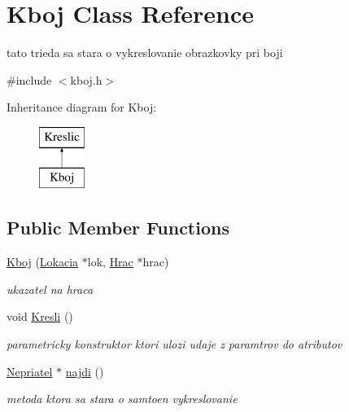 \hypertarget{class_kboj}{\section{Kboj Class Reference}
\label{class_kboj}
}


tato trieda sa stara o vykreslovanie obrazkovky pri boji  




{\ttfamily \#include $<$kboj.\-h$>$}

Inheritance diagram for Kboj\-:\begin{figure}[H]
\begin{center}
\leavevmode
\includegraphics[height=2.000000cm]{class_kboj}
\end{center}
\end{figure}
\subsection*{Public Member Functions}
\begin{DoxyCompactItemize}
\item 
\hypertarget{class_kboj_a7d88c71591763faf1cc9c33dc4aa84b5}{\hyperlink{class_kboj_a7d88c71591763faf1cc9c33dc4aa84b5}{Kboj} (\hyperlink{class_lokacia}{Lokacia} $\ast$lok, \hyperlink{class_hrac}{Hrac} $\ast$hrac)}\label{class_kboj_a7d88c71591763faf1cc9c33dc4aa84b5}

\begin{DoxyCompactList}\small\item\em ukazatel na hraca \end{DoxyCompactList}\item 
\hypertarget{class_kboj_af62fd0316418ce641fe7e388df88fdfd}{void \hyperlink{class_kboj_af62fd0316418ce641fe7e388df88fdfd}{Kresli} ()}\label{class_kboj_af62fd0316418ce641fe7e388df88fdfd}

\begin{DoxyCompactList}\small\item\em parametricky konstruktor ktori ulozi udaje z paramtrov do atributov \end{DoxyCompactList}\item 
\hypertarget{class_kboj_aca5a9f94fa87d6ccf1cd3f0ad0e0cfdb}{\hyperlink{class_nepriatel}{Nepriatel} $\ast$ \hyperlink{class_kboj_aca5a9f94fa87d6ccf1cd3f0ad0e0cfdb}{najdi} ()}\label{class_kboj_aca5a9f94fa87d6ccf1cd3f0ad0e0cfdb}

\begin{DoxyCompactList}\small\item\em metoda ktora sa stara o samtoen vykreslovanie \end{DoxyCompactList}\end{DoxyCompactItemize}
